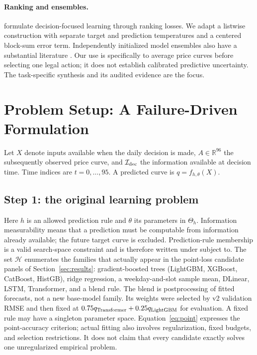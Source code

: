\documentclass[11pt,a4paper]{article}
\begin{document}
\paragraph{Ranking and ensembles.}
\citet{mandi2022} formulate decision-focused learning through ranking losses. We adapt a listwise construction with separate target and prediction temperatures and a centered block-sum error term. Independently initialized model ensembles also have a substantial literature \citep{lakshminarayanan2017}. Our use is specifically to average price curves before selecting one legal action; it does not establish calibrated predictive uncertainty. The task-specific synthesis and its audited evidence are the focus.

\section{Problem Setup: A Failure-Driven Formulation}
Let $X$ denote inputs available when the daily decision is made, $A\in\mathbb R^{96}$ the subsequently observed price curve, and $\mathcal I_{\rm dec}$ the information available at decision time. Time indices are $t=0,\ldots,95$. A predicted curve is $q=f_{h,\theta}(X)$.

\subsection{Step 1: the original learning problem}
\EqPoint
Here $h$ is an allowed prediction rule and $\theta$ its parameters in $\Theta_h$. Information measurability means that a prediction must be computable from information already available; the future target curve is excluded. Prediction-rule membership is a valid search-space constraint and is therefore written under subject to. The set $\mathcal H$ enumerates the families that actually appear in the point-loss candidate panels of Section~\ref{sec:results}: gradient-boosted trees (LightGBM, XGBoost, CatBoost, HistGB), ridge regression, a weekday-and-slot sample mean, DLinear, LSTM, Transformer, and a blend rule. The blend is postprocessing of fitted forecasts, not a new base-model family. Its weights were selected by v2 validation RMSE and then fixed at $0.75q_{\rm Transformer}+0.25q_{\rm LightGBM}$ for evaluation. A fixed rule may have a singleton parameter space. Equation~\eqref{eq:point} expresses the point-accuracy criterion; actual fitting also involves regularization, fixed budgets, and selection restrictions. It does not claim that every candidate exactly solves one unregularized empirical problem.
\end{document}
